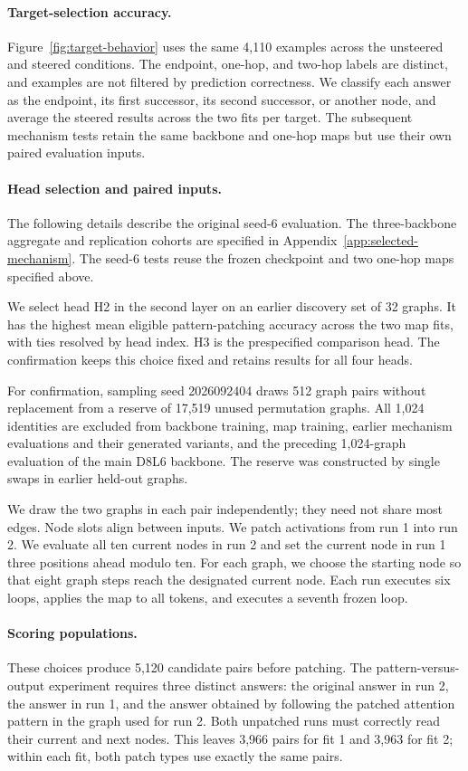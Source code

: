 \documentclass{article}
\begin{document}
\paragraph{Target-selection accuracy.}
Figure~\ref{fig:target-behavior} uses the same 4,110 examples across the unsteered and steered conditions. The endpoint, one-hop, and two-hop labels are distinct, and examples are not filtered by prediction correctness. We classify each answer as the endpoint, its first successor, its second successor, or another node, and average the steered results across the two fits per target. The subsequent mechanism tests retain the same backbone and one-hop maps but use their own paired evaluation inputs.

\paragraph{Head selection and paired inputs.}
The following details describe the original seed-6 evaluation. The three-backbone aggregate and replication cohorts are specified in Appendix~\ref{app:selected-mechanism}. The seed-6 tests reuse the frozen checkpoint and two one-hop maps specified above.

We select head H2 in the second layer on an earlier discovery set of 32 graphs. It has the highest mean eligible pattern-patching accuracy across the two map fits, with ties resolved by head index. H3 is the prespecified comparison head. The confirmation keeps this choice fixed and retains results for all four heads.

For confirmation, sampling seed 2026092404 draws 512 graph pairs without replacement from a reserve of 17,519 unused permutation graphs. All 1,024 identities are excluded from backbone training, map training, earlier mechanism evaluations and their generated variants, and the preceding 1,024-graph evaluation of the main D8L6 backbone. The reserve was constructed by single swaps in earlier held-out graphs.

We draw the two graphs in each pair independently; they need not share most edges. Node slots align between inputs. We patch activations from run 1 into run 2. We evaluate all ten current nodes in run 2 and set the current node in run 1 three positions ahead modulo ten. For each graph, we choose the starting node so that eight graph steps reach the designated current node. Each run executes six loops, applies the map to all tokens, and executes a seventh frozen loop.

\paragraph{Scoring populations.}
These choices produce 5,120 candidate pairs before patching. The pattern-versus-output experiment requires three distinct answers: the original answer in run 2, the answer in run 1, and the answer obtained by following the patched attention pattern in the graph used for run 2. Both unpatched runs must correctly read their current and next nodes. This leaves 3,966 pairs for fit 1 and 3,963 for fit 2; within each fit, both patch types use exactly the same pairs.
\end{document}
